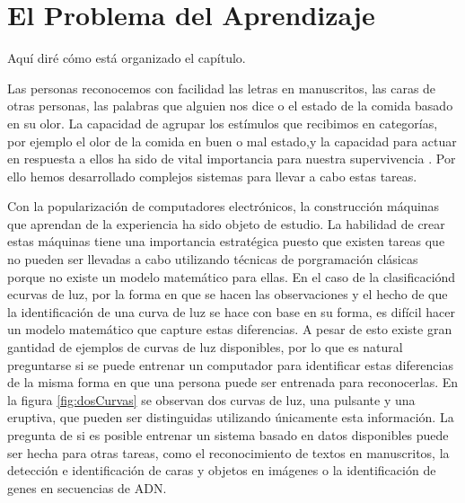 \documentclass[letterpaper,12pt]{book}
\begin{document}
\chapter{El Problema del Aprendizaje}

Aquí diré cómo está organizado el capítulo.

Las personas reconocemos con facilidad las letras en manuscritos, las caras de otras personas, las palabras que alguien nos dice o el estado de la comida basado en su olor. La capacidad de agrupar los estímulos que recibimos en categorías, por ejemplo el olor de la comida en buen o mal estado,y la capacidad para actuar en respuesta a ellos ha sido de vital importancia para nuestra supervivencia . Por ello  hemos desarrollado complejos sistemas para llevar a cabo estas tareas. 

Con la popularización de computadores electrónicos, la construcción máquinas que aprendan de la experiencia ha sido objeto de estudio. La habilidad de crear estas máquinas tiene una importancia estratégica puesto que existen tareas que no pueden ser llevadas a cabo utilizando técnicas de porgramación clásicas porque no existe un modelo matemático para ellas. En el caso de la clasificaciónd ecurvas de luz, por la forma en que se hacen las observaciones y el hecho de que la identificación de una curva de luz se hace con base en su forma, es difícil hacer un modelo matemático que capture estas diferencias. A pesar de esto existe gran gantidad de ejemplos de curvas de luz disponibles, por lo que es natural preguntarse si se puede entrenar un computador para identificar estas diferencias de la misma forma en que una persona puede ser entrenada para reconocerlas. En la figura \ref{fig:dosCurvas} se observan dos curvas de luz, una pulsante y una eruptiva, que pueden ser distinguidas utilizando únicamente esta información. La pregunta de si es posible entrenar un sistema basado en datos disponibles puede ser hecha para otras tareas, como el reconocimiento de textos en manuscritos, la detección e identificación de caras y objetos en imágenes o la identificación de genes en secuencias de ADN. 
\end{document}
